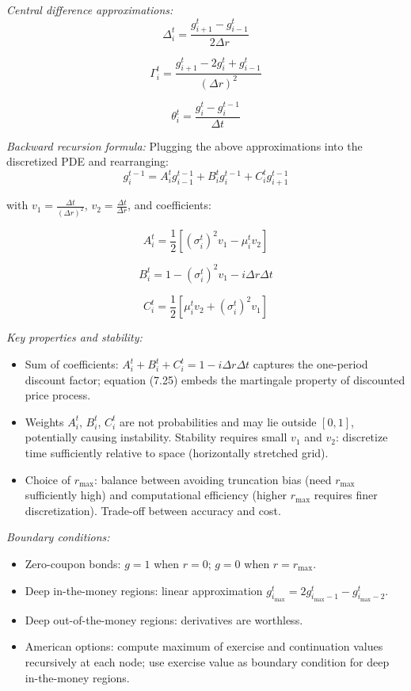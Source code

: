 \documentclass[12pt,a4paper]{article}
\begin{document}
\textit{Central difference approximations:}
$$\Delta_i^t = \frac{g_{i+1}^t - g_{i-1}^t}{2\Delta r}$$

$$\Gamma_i^t = \frac{g_{i+1}^t - 2g_i^t + g_{i-1}^t}{(\Delta r)^2}$$

$$\theta_i^t = \frac{g_i^t - g_i^{t-1}}{\Delta t}$$

\textit{Backward recursion formula:} Plugging the above approximations into the discretized PDE and rearranging:
$$g_i^{t-1} = A_i^t g_{i-1}^{t-1} + B_i^t g_i^{t-1} + C_i^t g_{i+1}^{t-1}$$

with $v_1 = \frac{\Delta t}{(\Delta r)^2}$, $v_2 = \frac{\Delta t}{\Delta r}$, and coefficients:

$$A_i^t = \frac{1}{2}[(\sigma_i^t)^2 v_1 - \mu_i^t v_2]$$

$$B_i^t = 1 - (\sigma_i^t)^2 v_1 - i\Delta r\Delta t$$

$$C_i^t = \frac{1}{2}[\mu_i^t v_2 + (\sigma_i^t)^2 v_1]$$

\textit{Key properties and stability:}
\begin{itemize}
\item Sum of coefficients: $A_i^t + B_i^t + C_i^t = 1 - i\Delta r\Delta t$ captures the one-period discount factor; equation (7.25) embeds the martingale property of discounted price process.
\item Weights $A_i^t$, $B_i^t$, $C_i^t$ are not probabilities and may lie outside $[0,1]$, potentially causing instability. Stability requires small $v_1$ and $v_2$: discretize time sufficiently relative to space (horizontally stretched grid).
\item Choice of $r_{\max}$: balance between avoiding truncation bias (need $r_{\max}$ sufficiently high) and computational efficiency (higher $r_{\max}$ requires finer discretization). Trade-off between accuracy and cost.
\end{itemize}

\textit{Boundary conditions:} 
\begin{itemize}
\item Zero-coupon bonds: $g = 1$ when $r = 0$; $g = 0$ when $r = r_{\max}$.
\item Deep in-the-money regions: linear approximation $g_{i_{\max}}^t = 2g_{i_{\max}-1}^t - g_{i_{\max}-2}^t$.
\item Deep out-of-the-money regions: derivatives are worthless.
\item American options: compute maximum of exercise and continuation values recursively at each node; use exercise value as boundary condition for deep in-the-money regions.
\end{itemize}
\end{document}
